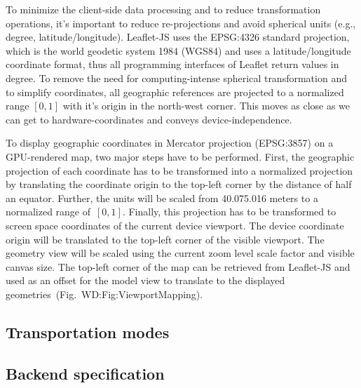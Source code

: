       To minimize the client-side data processing and to reduce transformation operations,
      it's important to reduce re-projections and avoid spherical units (e.g., degree,
      latitude/longitude). Leaflet-JS uses the EPSG:4326 standard projection, which is
      the world geodetic system 1984 (WGS84) and uses a latitude/longitude coordinate
      format, thus all programming interfaces of Leaflet return values in degree.
      To remove the need for computing-intense spherical transformation and to simplify
      coordinates, all geographic references are projected to a normalized range $[0, 1]$
      with it's origin in the north-west corner. This moves as close as we can get to
      hardware-coordinates and conveys device-independence.\par
      To dis\-play geographic coordinates in Mercator projection (EPSG:3857) on a GPU-rendered
      map, two major steps have to be performed. First, the geographic projection of
      each coordinate has to be transformed into a normalized projection by translating
      the coordinate origin to the top-left corner by the distance of half an equator.
      Further, the units will be scaled from 40.075.016 meters to a normalized range
      of~$[0,1]$. Finally, this projection has to be transformed to screen space coordinates
      of the current device viewport.  The device coordinate origin will be translated
      to the top-left corner of the visible viewport. The geometry view will be scaled
      using the current zoom level scale factor and visible canvas size. The top-left
      corner of the map can be retrieved from Leaflet-JS and used as an offset for
      the model view to translate to the displayed geometries~(Fig.~{WD:Fig:ViewportMapping}).
    \subsection{Transportation modes}
      \label{sec:conct:preli:tmode}
    \subsection{Backend specification}
      \label{sec:conct:preli:backe}
